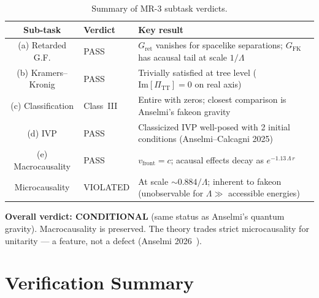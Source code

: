 \documentclass[11pt,a4paper]{article}
\newcommand{\PiTT}{\Pi_{\mathrm{TT}}}
\newcommand{\Imag}{\mathrm{Im}}
\newcommand{\Lam}{\Lambda}
\begin{document}
\begin{table}[htbp]
\centering
\caption{Summary of MR-3 subtask verdicts.}
\label{tab:summary}
\begin{tabular}{@{}clp{7cm}@{}}
\toprule
Sub-task & Verdict & Key result \\
\midrule
(a) Retarded G.F. & PASS & $G_{\mathrm{ret}}$ vanishes for spacelike separations;
  $G_{\mathrm{FK}}$ has acausal tail at scale $1/\Lam$ \\
(b) Kramers--Kronig & PASS & Trivially satisfied at tree level
  ($\Imag[\PiTT] = 0$ on real axis) \\
(c) Classification & Class~III & Entire with zeros; closest comparison is
  Anselmi's fakeon gravity \\
(d) IVP & PASS & Classicized IVP well-posed with 2 initial conditions
  (Anselmi--Calcagni 2025) \\
(e) Macrocausality & PASS & $v_{\mathrm{front}} = c$; acausal effects decay as
  $e^{-1.13\,\Lam\,r}$ \\
Microcausality & VIOLATED & At scale $\sim 0.884/\Lam$; inherent to fakeon
  (unobservable for $\Lam \gg$ accessible energies) \\
\bottomrule
\end{tabular}
\end{table}

\noindent\textbf{Overall verdict: CONDITIONAL} (same status as Anselmi's quantum
gravity). Macrocausality is preserved. The theory trades strict microcausality
for unitarity --- a feature, not a defect (Anselmi 2026~\cite{Anselmi2026}).

\section{Verification Summary}
\label{sec:verification}
\end{document}
